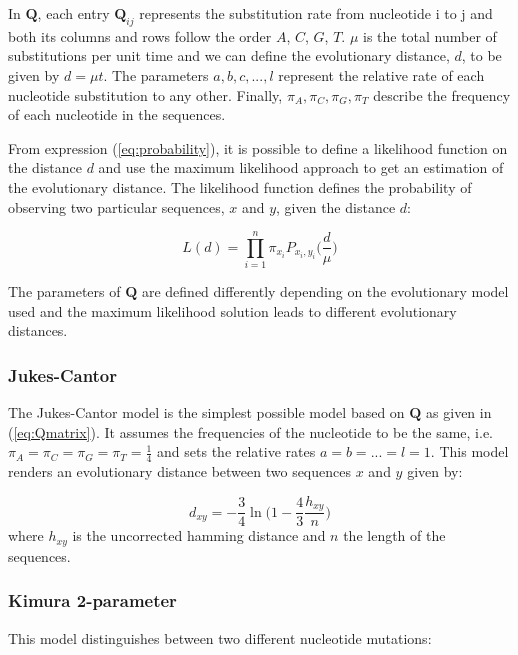 In $\mathbf{Q}$, each entry $\mathbf{Q}_{ij}$ represents the substitution rate from nucleotide i to j and both its columns and rows follow the order $A$, $C$, $G$, $T$. $\mu$ is the total number of substitutions per unit time and we can define the evolutionary distance, $d$, to be given by $d = \mu t$. The parameters $a, b, c, ..., l$ represent the relative rate of each nucleotide substitution to any other. Finally, $\pi_A, \pi_C, \pi_G, \pi_T$ describe the frequency of each nucleotide in the sequences. 

From expression (\ref{eq:probability}), it is possible to define a likelihood function on the distance $d$ and use the maximum likelihood approach to get an estimation of the evolutionary distance. The likelihood function defines the probability of observing two particular sequences, $x$ and $y$, given the distance $d$:

$$L(d) = \prod_{i=1}^n \pi_{x_i}P_{x_i, y_i}\Big(\frac{d}{\mu}\Big)$$

The parameters of $\mathbf{Q}$ are defined differently depending on the evolutionary model used and the maximum likelihood solution leads to different evolutionary distances. 

\subsubsection{Jukes-Cantor}\label{JK_model}

The Jukes-Cantor model \cite{JC69} is the simplest possible model based on $\mathbf{Q}$ as given in (\ref{eq:Qmatrix}). It assumes the frequencies of the nucleotide to be the same, i.e. $\pi_A = \pi_C = \pi_G = \pi_T = \frac{1}{4}$ and sets the relative rates $a=b= ... = l = 1$. This model renders an evolutionary distance between two sequences $x$ and $y$ given by:

\begin{equation}
d_{xy} = -\frac{3}{4}\ln \bigg(1- \frac{4}{3}\frac{h_{xy}}{n}\bigg)
\label{eq:JC_distance}
\end{equation}
where $h_{xy}$ is the uncorrected hamming distance and $n$ the length of the sequences.

\subsubsection{Kimura 2-parameter}\label{K2P_model}

This model \cite{K80} distinguishes between two different nucleotide mutations:

